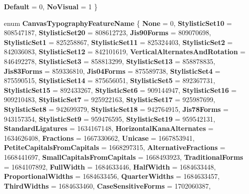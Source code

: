 \begin{DoxyCompactItemize}
{\bfseries Default} = 0, 
{\bfseries No\+Visual} = 1
 \}
\item 
\mbox{\label{namespace_microsoft_1_1_graphics_1_1_canvas_1_1_text_a0b3acf542d0a5a81f48cf181f63ab6d7}} 
enum {\bfseries Canvas\+Typography\+Feature\+Name} \{ \newline
{\bfseries None} = 0, 
{\bfseries Stylistic\+Set10} = 808547187, 
{\bfseries Stylistic\+Set20} = 808612723, 
{\bfseries Jis90\+Forms} = 809070698, 
\newline
{\bfseries Stylistic\+Set1} = 825258867, 
{\bfseries Stylistic\+Set11} = 825324403, 
{\bfseries Stylistic\+Set2} = 842036083, 
{\bfseries Stylistic\+Set12} = 842101619, 
\newline
{\bfseries Vertical\+Alternates\+And\+Rotation} = 846492278, 
{\bfseries Stylistic\+Set3} = 858813299, 
{\bfseries Stylistic\+Set13} = 858878835, 
{\bfseries Jis83\+Forms} = 859336810, 
\newline
{\bfseries Jis04\+Forms} = 875589738, 
{\bfseries Stylistic\+Set4} = 875590515, 
{\bfseries Stylistic\+Set14} = 875656051, 
{\bfseries Stylistic\+Set5} = 892367731, 
\newline
{\bfseries Stylistic\+Set15} = 892433267, 
{\bfseries Stylistic\+Set6} = 909144947, 
{\bfseries Stylistic\+Set16} = 909210483, 
{\bfseries Stylistic\+Set7} = 925922163, 
\newline
{\bfseries Stylistic\+Set17} = 925987699, 
{\bfseries Stylistic\+Set8} = 942699379, 
{\bfseries Stylistic\+Set18} = 942764915, 
{\bfseries Jis78\+Forms} = 943157354, 
\newline
{\bfseries Stylistic\+Set9} = 959476595, 
{\bfseries Stylistic\+Set19} = 959542131, 
{\bfseries Standard\+Ligatures} = 1634167148, 
{\bfseries Horizontal\+Kana\+Alternates} = 1634626408, 
\newline
{\bfseries Fractions} = 1667330662, 
{\bfseries Unicase} = 1667853941, 
{\bfseries Petite\+Capitals\+From\+Capitals} = 1668297315, 
{\bfseries Alternative\+Fractions} = 1668441697, 
\newline
{\bfseries Small\+Capitals\+From\+Capitals} = 1668493923, 
{\bfseries Traditional\+Forms} = 1684107892, 
{\bfseries Full\+Width} = 1684633446, 
{\bfseries Half\+Width} = 1684633448, 
\newline
{\bfseries Proportional\+Widths} = 1684633456, 
{\bfseries Quarter\+Widths} = 1684633457, 
{\bfseries Third\+Widths} = 1684633460, 
{\bfseries Case\+Sensitive\+Forms} = 1702060387, 
\newline

\end{DoxyCompactItemize}

